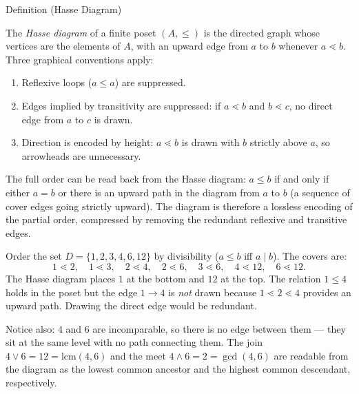 
\begin{definitionbox}{Definition (Hasse Diagram)}
\begin{definition}\label{def:hasse}
The \emph{Hasse diagram} of a finite poset $(A, \leq)$ is the directed graph
whose vertices are the elements of $A$, with an upward edge from $a$ to $b$
whenever $a \lessdot b$.  Three graphical conventions apply:
\begin{enumerate}[label=(\roman*)]
  \item Reflexive loops ($a \leq a$) are suppressed.
  \item Edges implied by transitivity are suppressed: if $a \lessdot b$ and
        $b \lessdot c$, no direct edge from $a$ to $c$ is drawn.
  \item Direction is encoded by height: $a \lessdot b$ is drawn with $b$
        strictly above $a$, so arrowheads are unnecessary.
\end{enumerate}
\end{definition}
\end{definitionbox}

\begin{remark*}
\label{rem:hasse-recovery}
The full order can be read back from the Hasse diagram: $a \leq b$ if and
only if either $a = b$ or there is an upward path in the diagram from $a$ to
$b$ (a sequence of cover edges going strictly upward).  The diagram is therefore
a lossless encoding of the partial order, compressed by removing the redundant
reflexive and transitive edges.
\end{remark*}

\begin{example*}[Divisibility on $\{1,2,3,4,6,12\}$]
\label{ex:hasse-divisibility}
Order the set $D = \{1, 2, 3, 4, 6, 12\}$ by divisibility ($a \leq b$ iff
$a \mid b$).  The covers are:
\[
  1 \lessdot 2,\quad
  1 \lessdot 3,\quad
  2 \lessdot 4,\quad
  2 \lessdot 6,\quad
  3 \lessdot 6,\quad
  4 \lessdot 12,\quad
  6 \lessdot 12.
\]
The Hasse diagram places $1$ at the bottom and $12$ at the top.  The relation
$1 \leq 4$ holds in the poset but the edge $1 \to 4$ is \emph{not} drawn
because $1 \lessdot 2 \lessdot 4$ provides an upward path.  Drawing the direct
edge would be redundant.

Notice also: $4$ and $6$ are incomparable, so there is no edge between them —
they sit at the same level with no path connecting them.  The join
$4 \vee 6 = 12 = \mathrm{lcm}(4,6)$ and the meet $4 \wedge 6 = 2 = \gcd(4,6)$
are readable from the diagram as the lowest common ancestor and the highest
common descendant, respectively.
\end{example*}

